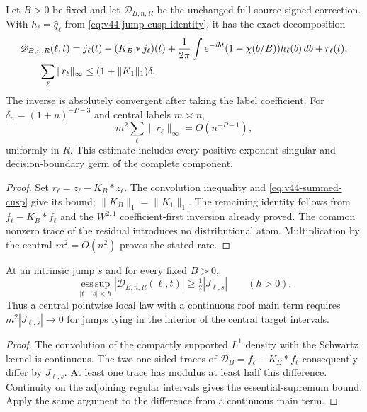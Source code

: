 \begin{corollary}
\label{cor:v44-cusp-local-scale}
Let $B>0$ be fixed and let $\mathscr D_{B,n,R}$ be the unchanged
full-source signed correction. With $h_\ell=\widehat q_\ell$ from
\eqref{eq:v44-jump-cusp-identity}, it has the exact decomposition
\begin{align}\label{eq:v44-refined-remainder}
 \mathscr D_{B,n,R}(\ell,t)
   ={}&j_\ell(t)-(K_B*j_\ell)(t)
       +\frac1{2\pi}\int e^{-ibt}(1-\chi(b/B))h_\ell(b)\,db
       +r_\ell(t),\\
 \sum_\ell\|r_\ell\|_\infty
   &\le(1+\|K_1\|_1)\delta.\notag
\end{align}
The inverse is absolutely convergent after taking the label coefficient.
For $\delta_n=(1+n)^{-P-3}$ and central labels $m\asymp n$,
\[
 m^2\sum_\ell\|r_\ell\|_\infty=O(n^{-P-1}),
\]
uniformly in $R$. This estimate includes every positive-exponent
singular and decision-boundary germ of the complete component.
\end{corollary}
\begin{proof}
Set $r_\ell=z_\ell-K_B*z_\ell$. The convolution inequality and
\eqref{eq:v44-summed-cusp} give its bound; $\|K_B\|_1=\|K_1\|_1$.
The remaining identity follows from $f_\ell-K_B*f_\ell$ and the
$W^{2,1}$ coefficient-first inversion already proved. The common
nonzero trace of the residual introduces no distributional atom.
Multiplication by the central $m^2=O(n^2)$ proves the stated rate.
\end{proof}

\begin{proposition}
\label{prop:v44-jump-test}
At an intrinsic jump $s$ and for every fixed $B>0$,
\begin{equation}\label{eq:v44-jump-lower-bound}
 \operatorname*{ess\,sup}_{|t-s|<h}|\mathscr D_{B,n,R}(\ell,t)|
                    \ge\tfrac12|J_{\ell,s}|\qquad(h>0).
\end{equation}
Thus a central pointwise local law with a continuous roof main term
requires $m^2|J_{\ell,s}|\to0$ for jumps lying in the interior of the
central target intervals.
\end{proposition}
\begin{proof}
The convolution of the compactly supported $L^1$ density with the
Schwartz kernel is continuous. The two one-sided traces of
$\mathscr D_B=f_\ell-K_B*f_\ell$ consequently differ by $J_{\ell,s}$.
At least one trace has modulus at least half this difference. Continuity
on the adjoining regular intervals gives the essential-supremum bound.
Apply the same argument to the difference from a continuous main term.
\end{proof}

